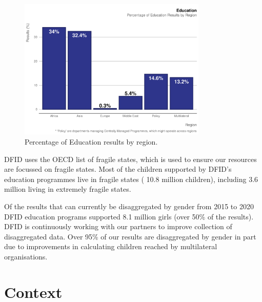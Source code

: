 \begin{figure}[htbp]
	\centering
\begin{knitrout}
\color{fgcolor}
\includegraphics[width=0.8\textwidth]{figs/education_region_plot-1} 

\end{knitrout}
	\caption{Percentage of Education results by region.}
	\label{fig:edu_region_plot}
\end{figure}

DFID uses the OECD list of fragile states, which is used to ensure our resources are focussed on fragile states. %
Most of the children supported by DFID's education programmes live in fragile states (
10.8
million children), including
3.6
million living in extremely fragile states. %

Of the results that can currently be disaggregated by gender from 2015 to 2020 DFID education programs supported
8.1
million girls (over 50\% of the results). %
DFID is continuously working with our partners to improve collection of disaggregated data.
Over 95\% of our results are disaggregated by gender in part due to improvements in calculating children reached by multilateral organisations. %


\section{Context}

